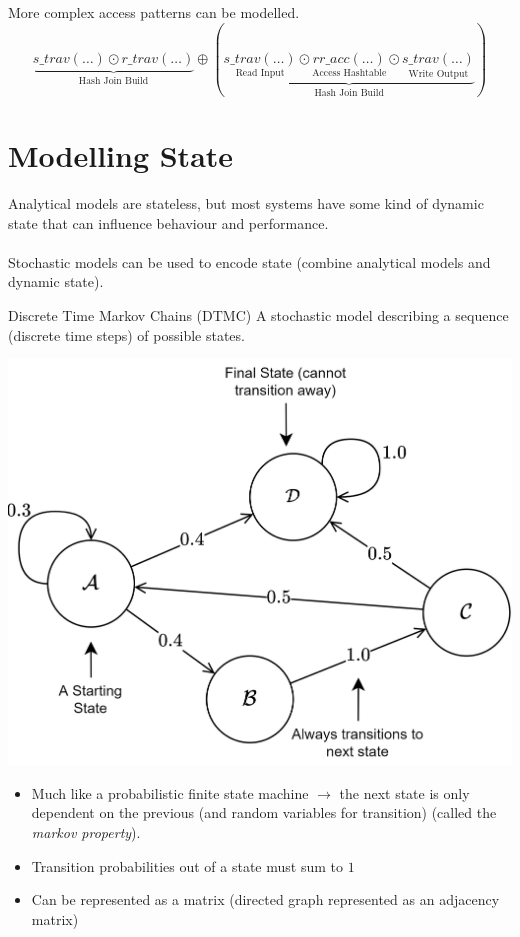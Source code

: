 More complex access patterns can be modelled.
\[\underbrace{s\_trav(\dots) \odot r\_trav(\dots)}_{\text{Hash Join Build}} \oplus \left( \underbrace{\underset{\text{Read Input}}{s\_trav(\dots)} \odot \underset{\text{Access Hashtable}}{rr\_acc(\dots)} \odot \underset{\text{Write Output}}{s\_trav(\dots)}}_{\text{Hash Join Build}} \right)\]

\section{Modelling State}
Analytical models are stateless, but most systems have some kind of dynamic state that can influence behaviour and performance.
\\
\\ Stochastic models can be used to encode state (combine analytical models and dynamic state).
\begin{definitionbox}{Discrete Time Markov Chains (DTMC)}
    A stochastic model describing a sequence (discrete time steps) of possible states.
    \begin{center}
        \includegraphics[width=.6\textwidth]{modelling/images/dtmc.drawio.png}
    \end{center}
    \begin{itemize}
        \item Much like a probabilistic finite state machine $\to$ the next state is only dependent on the previous (and random variables for transition) (called the \textit{markov property}).
        \item Transition probabilities out of a state must sum to $1$
        \item Can be represented as a matrix (directed graph represented as an adjacency matrix)
    \end{itemize}
\end{definitionbox}

